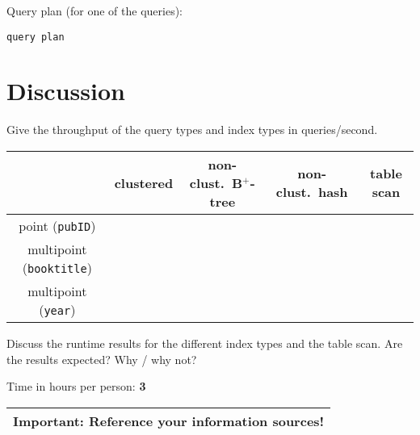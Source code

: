 \documentclass[11pt]{scrartcl}
\begin{document}
\smallskip\noindent
Query plan (for one of the queries):
{\small
\begin{verbatim}
query plan
\end{verbatim}
}

\section{Discussion}

Give the throughput of the query types and index types in queries/second.
\begin{center}
  \begin{tabular}{c|c|c|c|c}
    & clustered & non-clust.\ B$^+$-tree & non-clust.\ hash & table scan \\
    \hline
    point ({\tt pubID}) & & & \\
    \hline
    multipoint ({\tt booktitle}) & & & \\
    \hline
    multipoint  ({\tt year}) & & & \\  
  \end{tabular}
\end{center}

\medskip

Discuss the runtime results for the different index types and the
table scan. Are the results expected? Why / why not?


\bigskip

\noindent Time in hours per person: {\bf 3}

\bigskip

\begin{center}
  \begin{tabular}{c}
    \hline
    {\bf Important:} Reference your information sources!
    \\\hline
  \end{tabular}
\end{center}
\end{document}

